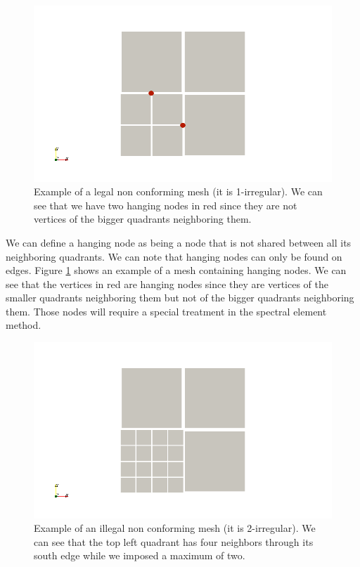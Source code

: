 \begin{figure}
\centering
\includegraphics[scale=0.30]{Theory/hang_ex.png}
\caption{Example of a legal non conforming mesh (it is 1-irregular). We can see that we have two hanging nodes in red since they are not vertices of the bigger quadrants neighboring them.}
\label{hang_ex}
\end{figure}

We can define a hanging node as being a node that is not shared between all its neighboring quadrants. We can note that hanging nodes can only be found on edges. Figure \ref{hang_ex} shows an example of a mesh containing hanging nodes. We can see that the vertices in red are hanging nodes since they are vertices of the smaller quadrants neighboring them but not of the bigger quadrants neighboring them. Those nodes will require a special treatment in the spectral element method. 

\begin{figure}
\centering
\includegraphics[scale=0.30]{Theory/hang_illegal.png}
\caption{Example of an illegal non conforming mesh (it is 2-irregular). We can see that the top left quadrant has four neighbors through its south edge while we imposed a maximum of two. }
\label{hang_illegal}
\end{figure}

